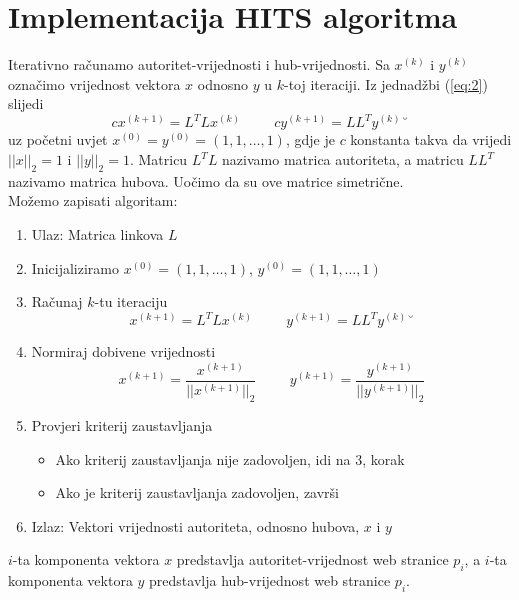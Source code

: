\documentclass[11pt]{article}
\begin{document}
\newpage
\section{Implementacija HITS algoritma}
Iterativno računamo autoritet-vrijednosti i hub-vrijednosti.
Sa $x^{(k)}$ i $y^{(k)}$ označimo vrijednost vektora $x$ odnosno $y$ u $k$-toj iteraciji. Iz jednadžbi (\ref{eq:2}) slijedi
\begin{equation}\label{eq:3}
cx^{(k+1)} = L^{T}Lx^{(k)}\hspace{1cm} cy^{(k+1)} = LL^{T}y^{(k)}˘
\end{equation}
uz početni uvjet
$x^{(0)} = y^{(0)} = (1, 1, \dots, 1)$, gdje je $c$ konstanta takva da vrijedi $||x||_{2} =1$ i $||y||_{2} =1$. Matricu $L^{T}L$ nazivamo matrica autoriteta, a matricu $LL^{T}$ nazivamo matrica hubova. Uočimo da su ove matrice simetrične.\\
Možemo zapisati algoritam:
\begin{enumerate}
\item Ulaz: Matrica linkova $L$
\item Inicijaliziramo $x^{(0)} = (1,1,\dots,1)$, $y^{(0)} = (1,1,\dots,1)$
\item Računaj $k$-tu iteraciju 
\begin{equation*}
x^{(k+1)} = L^{T}Lx^{(k)}\hspace{1cm} y^{(k+1)} = LL^{T}y^{(k)}˘
\end{equation*}
\item Normiraj dobivene vrijednosti
\begin{equation*}
x^{(k+1)} = \frac{x^{(k+1)}}{||x^{(k+1)}||_{2}}\hspace{1cm}y^{(k+1)} = \frac{y^{(k+1)}}{||y^{(k+1)}||_{2}}
\end{equation*}
\item Provjeri kriterij zaustavljanja
\begin{itemize}
\item Ako kriterij zaustavljanja nije zadovoljen, idi na 3, korak
\item Ako je kriterij zaustavljanja zadovoljen, završi
\end{itemize}
\item Izlaz: Vektori vrijednosti autoriteta, odnosno hubova, $x$ i $y$
\end{enumerate}
$i$-ta komponenta vektora $x$ predstavlja autoritet-vrijednost web stranice $p_{i}$, a $i$-ta komponenta vektora $y$ predstavlja hub-vrijednost web stranice $p_{i}$.

\newpage
\end{document}
